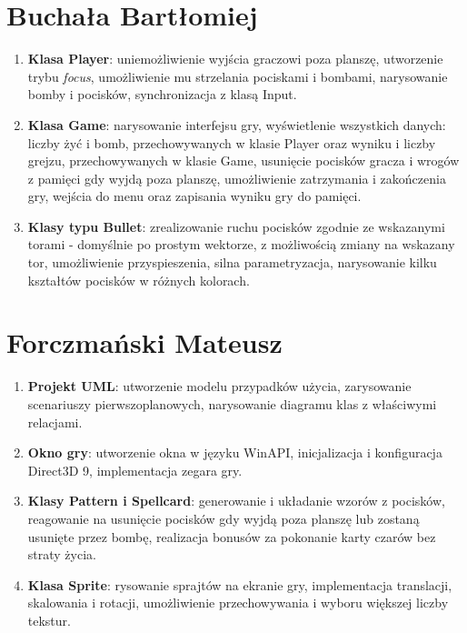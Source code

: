 \documentclass[a4paper,twoside]{article}
\begin{document}
	\section{Buchała Bartłomiej}
	\begin{enumerate}[label=\alph*.]
		\item \textbf{Klasa Player}: uniemożliwienie wyjścia graczowi poza planszę, utworzenie trybu \emph{focus}, umożliwienie mu strzelania pociskami i bombami, narysowanie bomby i pocisków, synchronizacja z klasą Input.
		\item \textbf{Klasa Game}: narysowanie interfejsu gry, wyświetlenie wszystkich danych: liczby żyć i bomb, przechowywanych w klasie Player oraz wyniku i liczby grejzu, przechowywanych w klasie Game, usunięcie pocisków gracza i wrogów z pamięci gdy wyjdą poza planszę, umożliwienie zatrzymania i zakończenia gry, wejścia do menu oraz zapisania wyniku gry do pamięci.
		\item \textbf{Klasy typu Bullet}: zrealizowanie ruchu pocisków zgodnie ze wskazanymi torami - domyślnie po prostym wektorze, z możliwością zmiany na wskazany tor, umożliwienie przyspieszenia, silna parametryzacja, narysowanie kilku kształtów pocisków w różnych kolorach.
	\end{enumerate}
	
	\section{Forczmański Mateusz}
	\begin{enumerate}[label=\alph*.]
		\item \textbf{Projekt UML}: utworzenie modelu przypadków użycia, zarysowanie scenariuszy pierwszoplanowych, narysowanie diagramu klas z właściwymi relacjami.
		\item \textbf{Okno gry}: utworzenie okna w języku WinAPI, inicjalizacja i konfiguracja Direct3D 9, implementacja zegara gry.
		\item \textbf{Klasy Pattern i Spellcard}: generowanie i układanie wzorów z pocisków, reagowanie na usunięcie pocisków gdy wyjdą poza planszę lub zostaną usunięte przez bombę, realizacja bonusów za pokonanie karty czarów bez straty życia.
		\item \textbf{Klasa Sprite}: rysowanie sprajtów na ekranie gry, implementacja translacji, skalowania i rotacji, umożliwienie przechowywania i wyboru większej liczby tekstur.
	\end{enumerate}
	
\end{document}
